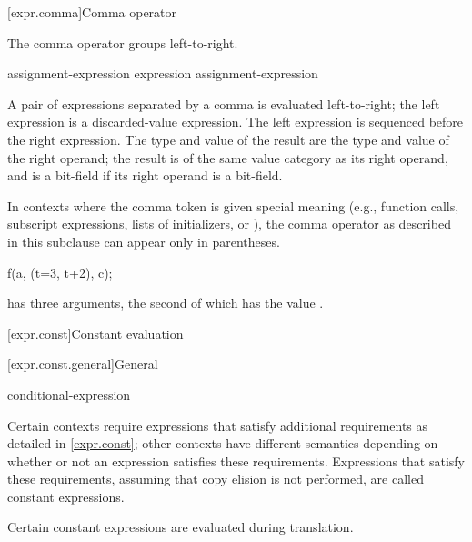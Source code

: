 [expr.comma]{Comma operator}%
%
%
%
%
%

\pnum
The comma operator groups left-to-right.

\begin{bnf}
\br
    assignment-expression\br
    expression \terminal{,} assignment-expression
\end{bnf}

A pair of expressions separated by a comma is evaluated left-to-right;
the left expression is
a discarded-value expression.
The left expression is sequenced before
the right expression.
%
The type and value of the
result are the type and value of the right operand; the result is of the same
value category as its right operand, and is a bit-field if its
right operand is a bit-field.

\pnum
\begin{note}
In contexts where the comma token is given special meaning
(e.g., function calls,
subscript expressions,
lists of initializers,
or ),
the comma operator as described in this subclause can appear only in parentheses.
\begin{example}
\begin{codeblock}
f(a, (t=3, t+2), c);
\end{codeblock}
has three arguments, the second of which has the value
.
\end{example}
\end{note}

[expr.const]{Constant evaluation}%

[expr.const.general]{General}

\begin{bnf}
\br
    conditional-expression
\end{bnf}

\pnum
Certain contexts require expressions that satisfy additional
requirements as detailed in \ref{expr.const}; other contexts have different
semantics depending on whether or not an expression satisfies these requirements.
Expressions that satisfy these requirements,
assuming that copy elision is not performed,
are called constant expressions.
\begin{note}
Certain constant expressions are evaluated during translation.
\end{note}

